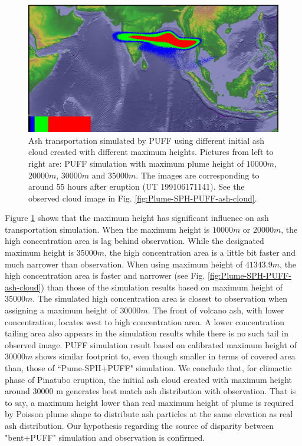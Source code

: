 \begin{figure}[!htb]
\begin{minipage}{.245 \textwidth}
    \end{minipage}%
    \begin{minipage}{.245 \textwidth}
        \centering
        \includegraphics[width=0.99 \textwidth]{Chapter-7/Figures/bent-55hr-ash-MaxH35000}
    \end{minipage}%
    \caption{Ash transportation simulated by PUFF using different initial ash cloud created with different maximum heights. Pictures from left to right are: PUFF simulation with maximum plume height of $10000 m$, $20000 m$, $30000 m$ and $35000 m$. The images are corresponding to around 55 hours after eruption (UT 199106171141).  See the observed cloud image in Fig. \ref{fig:Plume-SPH-PUFF-ash-cloud}. }
    \label{fig:Various-Maximum-height-Pinatubo-ash-cloud}
\end{figure}

Figure \ref{fig:Various-Maximum-height-Pinatubo-ash-cloud} shows that the maximum height has significant influence on ash transportation simulation. When the maximum height is $10000 m$ or $20000 m$, the high concentration area is lag behind observation. While the designated maximum height is $35000 m$, the high concentration area is a little bit faster and much narrower than observation. When using maximum height of $41343.9 m$, the high concentration area is faster and narrower (see Fig. \ref{fig:Plume-SPH-PUFF-ash-cloud}) than those of the simulation results based on maximum height of $35000 m$. The simulated high concentration area is closest to observation when assigning a maximum height of $30000 m$. The front of volcano ash, with lower concentration, locates west to high concentration area. A lower concentration tailing area also appears in the simulation results while there is no such tail in observed image. PUFF simulation result based on calibrated maximum height of $30000 m$ shows similar footprint to, even though smaller in terms of covered area than, those of ``Pume-SPH+PUFF" simulation. We conclude that, for climactic phase of Pinatubo eruption, the initial ash cloud created with maximum height around 30000 m generates best match ash distribution with observation. That is to say, a maximum height lower than real maximum height of plume is required by Poisson plume shape to distribute ash particles at the same elevation as real ash distribution. Our hypothesis regarding the source of disparity between "bent+PUFF" simulation and observation is confirmed.


